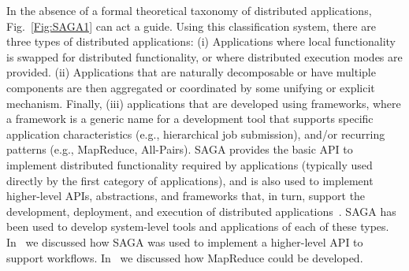 \documentclass{rspublic}
\begin{document}
In the absence of a formal theoretical taxonomy of distributed
applications, Fig.~\ref{Fig:SAGA1} can act a guide. Using this
classification system, there are three types of distributed
applications: (i) Applications where local functionality is swapped
for distributed functionality, or where distributed execution modes
are provided. %
(ii) Applications that are naturally decomposable or have multiple
components are then aggregated or coordinated by some unifying or
explicit mechanism. %
Finally, (iii) applications that are developed using frameworks, where a
framework is a generic name for a development tool that supports
specific application characteristics (e.g., hierarchical job
submission), and/or recurring patterns (e.g., MapReduce, All-Pairs).
SAGA provides the basic API to implement distributed functionality
required by applications (typically used directly by the first category
of applications), and is also used to implement higher-level APIs,
abstractions, and frameworks that, in turn, support the development,
deployment, and execution of distributed
applications~\citep{saga_gmac09}. SAGA has been used to develop
system-level tools and applications of each of these types.
In~\cite{saga_montage_escience09} we discussed how SAGA was used to
implement a higher-level API to support workflows.
In~\cite{saga_ccgrid09} we discussed how MapReduce could be developed.


\end{document}
